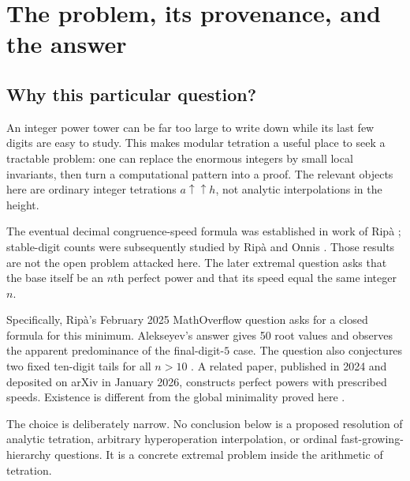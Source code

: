 \documentclass[11pt,a4paper]{article}
\theoremstyle{definition}
\begin{document}
{\setlength{\parskip}{0pt}\tableofcontents}
\clearpage

\section{The problem, its provenance, and the answer}
\label{sec:problem}

\subsection{Why this particular question?}
An integer power tower can be far too large to write down while its last
few digits are easy to study. This makes modular tetration a useful place
to seek a tractable problem: one can replace the enormous integers by
small local invariants, then turn a computational pattern into a proof.
The relevant objects here are ordinary integer tetrations
$a\uparrow\uparrow h$, not analytic interpolations in the height.

The eventual decimal congruence-speed formula was established in work of
Rip\`a \cite{ripa2020,ripa2021}; stable-digit counts were subsequently
studied by Rip\`a and Onnis \cite{ripaonnis2022}. Those results are not the
open problem attacked here. The later extremal question asks that the
base itself be an $n$th perfect power and that its speed equal the same
integer $n$.

Specifically, Rip\`a's February 2025 MathOverflow question asks for a closed
formula for this minimum. Alekseyev's answer gives 50 root values and
observes the apparent predominance of the final-digit-$5$ case. The
question also conjectures two fixed ten-digit tails for all $n>10$
\cite{mo2025}. A related paper, published in 2024 and deposited on arXiv in January
2026, constructs perfect powers with prescribed speeds. Existence is
different from the global minimality proved here \cite{ripa2026}.

The choice is deliberately narrow. No conclusion below is a proposed
resolution of analytic tetration, arbitrary hyperoperation interpolation,
or ordinal fast-growing-hierarchy questions. It is a concrete extremal
problem inside the arithmetic of tetration.
\end{document}
